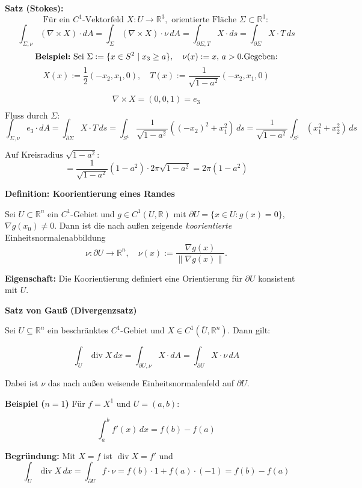 \textbf{Satz (Stokes):} \\
\[
\text{Für ein } C^1\text{-Vektorfeld } X : U \to \mathbb{R}^3, \text{ orientierte Fläche } \Sigma \subset \mathbb{R}^3: 
\]
\[
\int_{\Sigma, \nu} (\nabla \times X) \cdot dA 
= \int_{\Sigma} (\nabla \times X) \cdot \nu \, dA 
= \int_{\partial \Sigma, T} X \cdot ds 
= \int_{\partial \Sigma} X \cdot T \, ds
\]
\[
\textbf{Beispiel:} \text{ Sei } \Sigma := \{x \in S^2 \mid x_3 \geq a \}, \quad \nu(x) := x, \, a > 0. \\
\text{Gegeben:}
\]
\[
X(x) := \frac{1}{2}(-x_2, x_1, 0), \quad T(x) := \frac{1}{\sqrt{1 - a^2}}(-x_2, x_1, 0)
\]

\[
\nabla \times X = (0, 0, 1) = e_3
\]

$\text{Fluss durch } \Sigma: $
\[
\int_{\Sigma, \nu} e_3 \cdot dA 
= \int_{\partial \Sigma} X \cdot T \, ds 
= \int_{S^1} \frac{1}{\sqrt{1-a^2}} ((-x_2)^2 + x_1^2) \, ds 
= \frac{1}{\sqrt{1 - a^2}} \int_{S^1} (x_1^2 + x_2^2) \, ds
\]

$\text{Auf Kreisradius } \sqrt{1 - a^2}: $
\[
= \frac{1}{\sqrt{1 - a^2}} (1 - a^2) \cdot 2\pi\sqrt{1 - a^2}
= 2\pi (1 - a^2)
\]

\textbf{Definition: Koorientierung eines Randes}

Sei $U \subset \mathbb{R}^n$ ein $C^1$-Gebiet und $g \in C^1(U, \mathbb{R})$ mit $\partial U = \{x \in U : g(x) = 0\}$, $\nabla g(x_0) \neq 0$.  
Dann ist die nach außen zeigende \textit{koorientierte} Einheitsnormalenabbildung
\[
\nu: \partial U \to \mathbb{R}^n, \quad \nu(x) := \frac{\nabla g(x)}{\|\nabla g(x)\|}.
\]

\textbf{Eigenschaft:}  
Die Koorientierung definiert eine Orientierung für $\partial U$ konsistent mit $U$.

\textbf{Satz von Gauß (Divergenzsatz)}

Sei $U \subseteq \mathbb{R}^n$ ein beschränktes $C^1$-Gebiet und $X \in C^1(\overline{U}, \mathbb{R}^n)$. Dann gilt:

\[
\int_U \operatorname{div} X \, dx = \int_{\partial U, \nu} X \cdot dA = \int_{\partial U} X \cdot \nu \, dA
\]

Dabei ist $\nu$ das nach außen weisende Einheitsnormalenfeld auf $\partial U$.

\textbf{Beispiel ($n=1$)}
Für $f = X^1$ und $U = (a,b)$:

\[
\int_a^b f'(x)\, dx = f(b) - f(a)
\]

\textbf{Begründung:} Mit $X = f$ ist $\operatorname{div} X = f'$ und
\[
\int_U \operatorname{div} X \, dx = \int_{\partial U} f \cdot \nu = f(b)\cdot 1 + f(a)\cdot (-1) = f(b) - f(a)
\]

